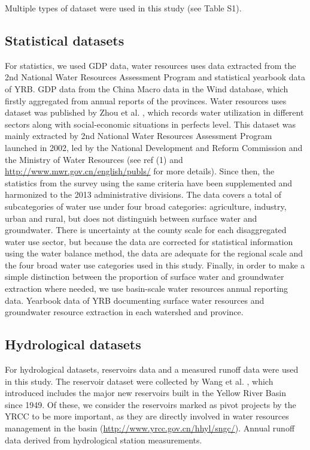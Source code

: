 \documentclass[9pt,twoside,lineno]{pnas-new}
\begin{document}
Multiple types of dataset were used in this study (see Table S1). 
\subsection*{Statistical datasets}
For statistics, we used GDP data, water resources uses data extracted from the 2nd National Water Resources Assessment Program \cite{zhouDecelerationChinaHuman2020} and statistical yearbook data of YRB. GDP data from the China Macro data in the Wind database, which firstly aggregated from annual reports of the provinces. Water resources uses dataset was published by Zhou et al. \cite{zhouDecelerationChinaHuman2020}, which records water utilization in different sectors along with social-economic situations in perfects level. This dataset was mainly extracted by 2nd National Water Resources Assessment Program launched in 2002, led by the National Development and Reform Commission and the Ministry of Water Resources (see ref (1) and \url{http://www.mwr.gov.cn/english/publs/} for more details). Since then, the statistics from the survey using the same criteria have been supplemented and harmonized to the 2013 administrative divisions. 
The data covers a total of subcategories of water use under four broad categories: agriculture, industry, urban and rural, but does not distinguish between surface water and groundwater. There is uncertainty at the county scale for each disaggregated water use sector, but because the data are corrected for statistical information using the water balance method, the data are adequate for the regional scale and the four broad water use categories used in this study.
Finally, in order to make a simple distinction between the proportion of surface water and groundwater extraction where needed, we use basin-scale water resources annual reporting data. Yearbook data of YRB documenting surface water resources and groundwater resource extraction in each watershed and province. 


\subsection*{Hydrological datasets}
For hydrological datasets, reservoirs data and a measured runoff data were used in this study.
The reservoir dataset were collected by Wang et al. \cite{wangYellowRiverWater2019}, which introduced includes the major new reservoirs built in the Yellow River Basin since 1949. Of these, we consider the reservoirs marked as pivot projects by the YRCC to be more important, as they are directly involved in water resources management in the basin (\url{http://www.yrcc.gov.cn/hhyl/sngc/}). Annual runoff data derived from hydrological station measurements.
\end{document}
